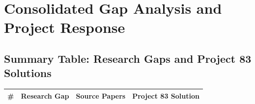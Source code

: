 \documentclass[a4paper,11pt]{article}
\begin{document}
\newpage

\section{Consolidated Gap Analysis and Project Response}

\subsection{Summary Table: Research Gaps and Project 83 Solutions}

\begin{longtable}{|c|p{3.5cm}|p{4cm}|p{4.5cm}|}
\hline
\rowcolor{blue!10}
\textbf{\#} & \textbf{Research Gap} & \textbf{Source Papers} & \textbf{Project 83 Solution} \\
\hline
\endhead


\end{longtable}
\end{document}
